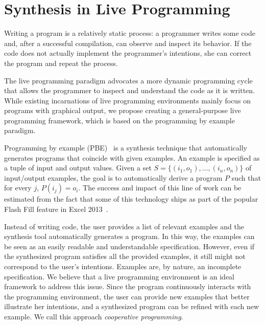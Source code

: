 \section{Synthesis in Live Programming}
\label{sec:goal}


Writing a program is a relatively static process: a programmer writes some code and, after a successful compilation, can observe and inspect its behavior. If the code does not actually implement the programmer's intentions, she can correct the program and repeat the process.

The live programming paradigm advocates a more dynamic programming cycle that allows the programmer to inspect and understand the code as it is written. While existing incarnations of live programming environments mainly focus on programs with graphical output, we propose creating a general-purpose live programming framework, which is based
on the programming by example paradigm. 

Programming by example (PBE)~\cite{cypher93,lieberman01,synasc12} is a synthesis technique that automatically generates programs that coincide with given examples. An example is specified as a tuple of input and output values. Given a set $S= \{(i_1, o_1),\ldots, (i_n, o_n)\}$ of input/output examples, the goal is to automatically derive a program $P$ such that for every $j$, $P(i_j) = o_i$. The success and impact of this line of work can be estimated from the fact that some of this technology ships as part of the popular Flash Fill feature in Excel 2013~\cite{flashFillPOPL}.

Instead of writing code, the user provides a list of relevant examples and the synthesis tool automatically generates a program. In this way, the examples can be seen as an easily readable and understandable specification. However, even if the synthesized program satisfies all the provided examples, it still might not correspond to the user's intentions. Examples are, by nature, an incomplete specification. We believe that a live programming environment is an ideal framework to address this issue. Since the program continuously interacts with the programming environment, the user can provide new examples that better illustrate her intentions, and a synthesized program can be refined with each new example. We call this approach {\emph{cooperative programming}}.


\noindent{}

